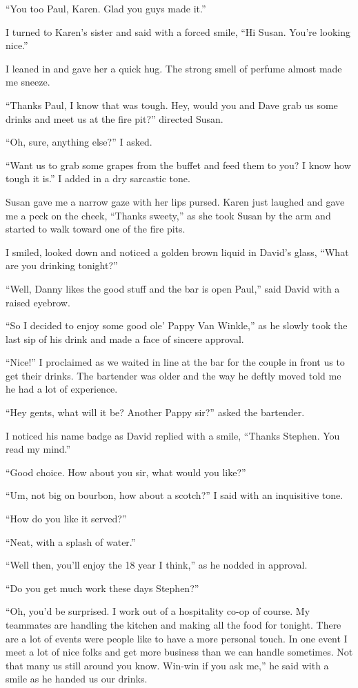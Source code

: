 ``You too Paul, Karen. Glad you guys made it.''

I turned to Karen's sister and said with a forced smile, ``Hi
Susan. You're looking nice.''

I leaned in and gave her a quick hug. The strong smell of
perfume almost made me sneeze.

``Thanks Paul, I know that was tough. Hey, would you and Dave
grab us some drinks and meet us at the fire pit?'' directed
Susan.

``Oh, sure, anything else?'' I asked.

``Want us to grab some grapes from the buffet and feed them to
you? I know how tough it is.'' I added in a dry sarcastic tone.

Susan gave me a narrow gaze with her lips pursed. Karen just
laughed and gave me a peck on the cheek, ``Thanks sweety,'' as
she took Susan by the arm and started to walk toward one of the
fire pits.

I smiled, looked down and noticed a golden brown liquid in David's
glass, ``What are you drinking tonight?''

``Well, Danny likes the good stuff and the bar is open Paul,''
said David with a raised eyebrow.

``So I decided to enjoy some good ole' Pappy Van Winkle,'' as he
slowly took the last sip of his drink and made a face of sincere
approval.

``Nice!'' I proclaimed as we waited in line at the bar for the
couple in front us to get their drinks. The bartender was older
and the way he deftly moved told me he had a lot of experience.

``Hey gents, what will it be? Another Pappy sir?'' asked the
bartender.

I noticed his name badge as David replied with a
smile, ``Thanks Stephen. You read my mind.''

``Good choice. How about you sir, what would you like?''


``Um, not big on bourbon, how about a scotch?'' I said with an
inquisitive tone.

``How do you like it served?''

``Neat, with a splash of water.''

``Well then, you'll enjoy the 18 year I think,'' as he nodded in
approval.

``Do you get much work these days Stephen?''

``Oh, you'd be surprised. I work out of a hospitality co-op of
course. My teammates are handling the kitchen and making all the
food for tonight. There are a lot of events were people like to
have a more personal touch. In one event I meet a lot of nice
folks and get more business than we can handle sometimes.  Not
that many us still around you know.  Win-win if you ask me,''
he said with a smile as he handed us our drinks.

